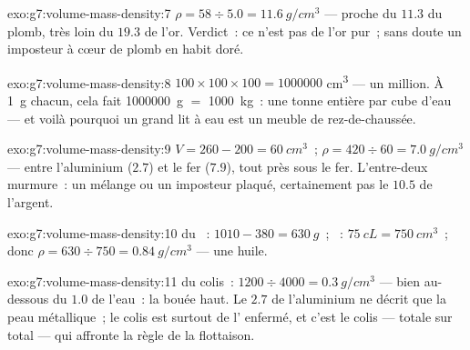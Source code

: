 \begin{solution}{exo:g7:volume-mass-density:7}
$\rho = 58 \div 5.0 = \qty{11.6}{g/cm^3}$ --- proche du $11.3$ du
plomb, très loin du $19.3$ de l'or. Verdict~: ce n'est pas de l'or
pur~; sans doute un imposteur à cœur de plomb en habit doré.
\end{solution}

\begin{solution}{exo:g7:volume-mass-density:8}
$100 \times 100 \times 100 = 1000000$ \unit{cm^3} --- un million. À
\qty{1}{g} chacun, cela fait \qty{1000000}{g} $=$ \qty{1000}{kg}~:
une tonne entière par  cube d'eau --- et voilà pourquoi un grand
lit à eau est un meuble de rez-de-chaussée.
\end{solution}

\begin{solution}{exo:g7:volume-mass-density:9}
$V = 260 - 200 = \qty{60}{cm^3}$~;
$\rho = 420 \div 60 = \qty{7.0}{g/cm^3}$ --- entre l'aluminium
($2.7$) et le fer ($7.9$), tout près sous le fer. L'entre-deux
murmure~: un mélange ou un imposteur plaqué, certainement pas le
$10.5$ de l'argent.
\end{solution}

\begin{solution}{exo:g7:volume-mass-density:10}
 du ~: $1010 - 380 = \qty{630}{g}$~; ~:
$\qty{75}{cL} = \qty{750}{cm^3}$~; donc
$\rho = 630 \div 750 = \qty{0.84}{g/cm^3}$ --- une huile.
\end{solution}

\begin{solution}{exo:g7:volume-mass-density:11}
 du colis~: $1200 \div 4000 = \qty{0.3}{g/cm^3}$ ---
bien au-dessous du $1.0$ de l'eau~: la bouée  haut. Le $2.7$ de
l'aluminium ne décrit que la peau métallique~; le colis est surtout
de l' enfermé, et c'est le colis ---  totale sur 
total --- qui affronte la règle de la flottaison.
\end{solution}

